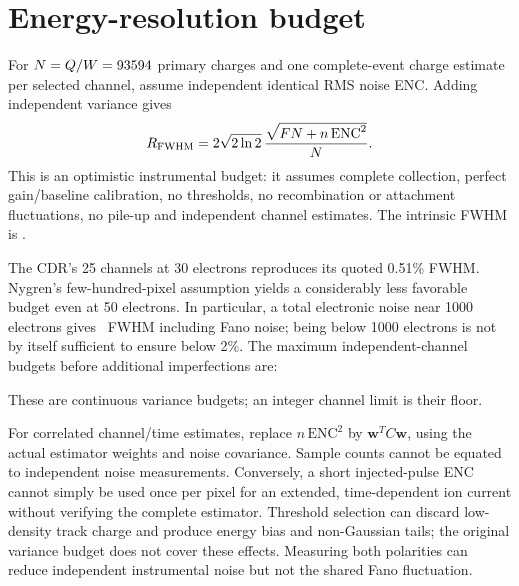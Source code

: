 \documentclass[11pt,a4paper]{article}
\begin{document}
\section{Energy-resolution budget}
For $N=Q/W=93594$ primary charges and one complete-event charge
estimate per selected channel, assume independent identical RMS noise ENC.
Adding independent variance gives
\begin{equation}
 R_{\rm FWHM}=2\sqrt{2\ln2}\,
 \frac{\sqrt{FN+n\,\mathrm{ENC}^2}}{N}.
 \label{eq:budget}
\end{equation}
This is an optimistic instrumental budget: it assumes complete collection,
perfect gain/baseline calibration, no thresholds, no recombination or
attachment fluctuations, no pile-up and independent channel estimates.
The intrinsic FWHM is \IntrinsicFWHM.

\begin{center}\small

\end{center}

The CDR's 25 channels at 30 electrons reproduces its quoted 0.51\% FWHM.
Nygren's few-hundred-pixel assumption yields a considerably less favorable
budget even at 50 electrons. In particular, a total electronic noise near
1000 electrons gives \ThousandENCResolution\ FWHM including Fano noise;
being below 1000 electrons is not by itself sufficient to ensure below 2\%.
The maximum independent-channel budgets before additional imperfections are:

\begin{center}\small

\end{center}
These are continuous variance budgets; an integer channel limit is their floor.

For correlated channel/time estimates, replace $n\,\mathrm{ENC}^2$ by
$\boldsymbol w^T C\boldsymbol w$, using the actual estimator weights and
noise covariance. Sample counts cannot be equated to independent noise
measurements. Conversely, a short injected-pulse ENC cannot simply be used
once per pixel for an extended, time-dependent ion current without verifying
the complete estimator. Threshold selection can discard low-density track
charge and produce energy bias and non-Gaussian tails; the original variance
budget does not cover these effects. Measuring both polarities can reduce
independent instrumental noise but not the shared Fano fluctuation.
\end{document}
